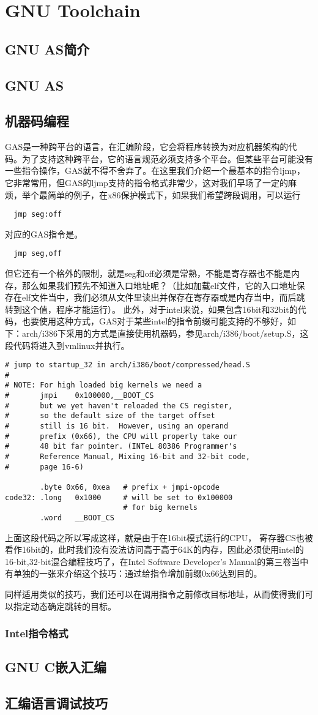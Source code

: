 \chapter{GNU Toolchain}
\section{GNU AS简介}
\section{GNU AS}
\section{机器码编程}
GAS是一种跨平台的语言，在汇编阶段，它会将程序转换为对应机器架构的代码。为了支持这种跨平台，它的语言规范必须支持多个平台。但某些平台可能没有一些指令操作，GAS就不得不舍弃了。在这里我们介绍一个最基本的指令ljmp，它非常常用，但GAS的ljmp支持的指令格式非常少，这对我们早场了一定的麻烦，举个最简单的例子，在x86保护模式下，如果我们希望跨段调用，可以运行
\begin{lstlisting}
  jmp seg:off
\end{lstlisting}
对应的GAS指令是。
\begin{lstlisting}
  jmp seg,off
\end{lstlisting}
但它还有一个格外的限制，就是seg和off必须是常熟，不能是寄存器也不能是内存，那么如果我们预先不知道入口地址呢？（比如加载elf文件，它的入口地址保存在elf文件当中，我们必须从文件里读出并保存在寄存器或是内存当中，而后跳转到这个值，程序才能运行）。
此外，对于intel来说，如果包含16bit和32bit的代码，也要使用这种方式，GAS对于某些intel的指令前缀可能支持的不够好，如下：arch/i386下采用的方式是直接使用机器码，参见arch/i386/boot/setup.S，这段代码将进入到vmlinux并执行。
\begin{lstlisting}
# jump to startup_32 in arch/i386/boot/compressed/head.S
#
# NOTE: For high loaded big kernels we need a
#       jmpi    0x100000,__BOOT_CS
#       but we yet haven't reloaded the CS register,
#       so the default size of the target offset
#       still is 16 bit.  However, using an operand 
#       prefix (0x66), the CPU will properly take our 
#       48 bit far pointer. (INTeL 80386 Programmer's 
#       Reference Manual, Mixing 16-bit and 32-bit code, 
#       page 16-6)

        .byte 0x66, 0xea   # prefix + jmpi-opcode
code32: .long   0x1000     # will be set to 0x100000
                           # for big kernels
        .word   __BOOT_CS

\end{lstlisting}
上面这段代码之所以写成这样，就是由于在16bit模式运行的CPU， 寄存器CS也被看作16bit的，此时我们没有没法访问高于高于64K的内存，因此必须使用intel的16-bit,32-bit混合编程技巧了，在Intel Software Developer's Manual的第三卷当中有单独的一张来介绍这个技巧：通过给指令增加前缀0x66达到目的。

同样适用类似的技巧，我们还可以在调用指令之前修改目标地址，从而使得我们可以指定动态确定跳转的目标。
\subsection{Intel指令格式}
\section{GNU C嵌入汇编}
\section{汇编语言调试技巧}
